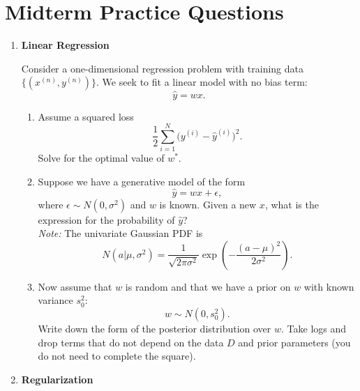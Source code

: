 \documentclass{article}
\begin{document}
\section*{Midterm Practice Questions}
\begin{enumerate}[label=\textbf{\arabic*.}]
    \item \textbf{Linear Regression}

    Consider a one-dimensional regression problem with training data $\{(x^{(n)}, y^{(n)})\}$. We seek to fit a linear model with no bias term:
    \[
    \hat{y} = wx.
    \]
    \begin{enumerate}[label=(\alph*)]
        \item Assume a squared loss
        \[
        \frac{1}{2} \sum_{i=1}^N \bigl(y^{(i)} - \hat{y}^{(i)}\bigr)^2.
        \]
        Solve for the optimal value of $w^*$.
        \item Suppose we have a generative model of the form
        \[
        \hat{y} = wx + \epsilon,
        \]
        where $\epsilon \sim N(0,\sigma^2)$ and $w$ is known. Given a new $x$, what is the expression for the probability of $\hat{y}$?\\[1mm]
        \textit{Note:} The univariate Gaussian PDF is
        \[
        N(a|\mu,\sigma^2)= \frac{1}{\sqrt{2\pi\sigma^2}} \exp\left(-\frac{(a-\mu)^2}{2\sigma^2}\right).
        \]
        \item Now assume that $w$ is random and that we have a prior on $w$ with known variance $s_0^2$:
        \[
        w \sim N(0,s_0^2).
        \]
        Write down the form of the posterior distribution over $w$. Take logs and drop terms that do not depend on the data $D$ and prior parameters (you do not need to complete the square).
    \end{enumerate}

    \item \textbf{Regularization}


\end{enumerate}
\end{document}
